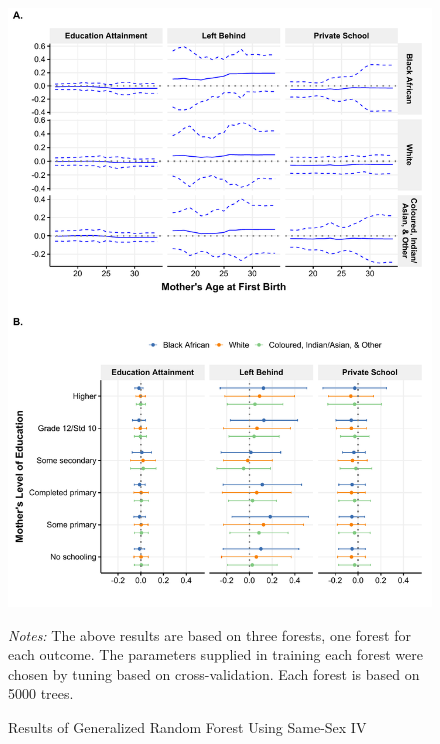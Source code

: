 \documentclass[11pt,a4paper]{article}
\newcommand\fnote[1]{\captionsetup{font=footnotesize}\caption*{#1}}
\begin{document}
\begin{figure}[h!]
\centering
\caption{\label{fig:07}Results of Generalized Random Forest Using Same-Sex IV}
\includegraphics[width=\textwidth]{figures/heter2.pdf}
\fnote{\textit{Notes:} The above results are based on three forests, one forest for each outcome. The parameters supplied in training each forest were chosen by tuning based on cross-validation. Each forest is based on 5000 trees. }
\end{figure}




 



\end{document}
